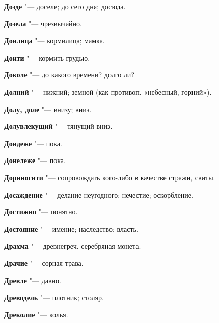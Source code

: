 \begin{mymulticols}{2}
\noindent\textbf{Дозде} "--- доселе; до сего дня; досюда. 




\noindent\textbf{Дозела} "--- чрезвычайно. 




\noindent\textbf{Доилица} "--- кормилица; мамка. 




\noindent\textbf{Доити} "--- кормить грудью. 




\noindent\textbf{Доколе} "--- до какого времени? долго ли? 




\noindent\textbf{Долний} "--- нижний; земной (как противоп. «небесный, горний»). 




\noindent\textbf{Долу, доле} "--- внизу; вниз. 




\noindent\textbf{Долувлекущий} "--- тянущий вниз. 




\noindent\textbf{Дондеже} "--- пока. 




\noindent\textbf{Донележе} "--- пока. 




\noindent\textbf{Дориносити} "--- сопровождать кого-либо в качестве стражи, свиты. 




\noindent\textbf{Досаждение} "--- делание неугодного; нечестие; оскорбление. 




\noindent\textbf{Достижно} "--- понятно. 




\noindent\textbf{Достояние} "--- имение; наследство; власть. 




\noindent\textbf{Драхма} "--- древнегреч. серебряная монета. 




\noindent\textbf{Драчие} "--- сорная трава. 




\noindent\textbf{Древле} "--- давно. 




\noindent\textbf{Древодель} "--- плотник; столяр. 




\noindent\textbf{Дреколие} "--- колья. 





\end{mymulticols}
